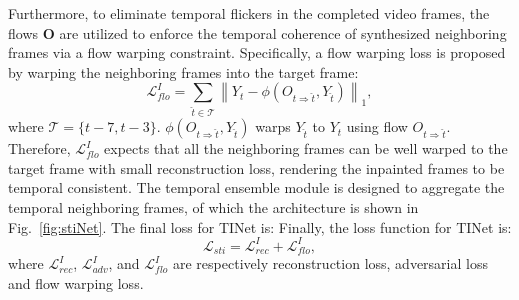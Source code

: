 Furthermore, to eliminate temporal flickers in the completed video frames, the flows $\boldsymbol{O}$ are utilized to enforce the temporal coherence of synthesized neighboring frames via a flow warping constraint. 
%
Specifically, a flow warping loss is proposed by warping the neighboring frames into the target frame: 
\begin{equation}
	\label{eq:inp_flow}
	\mathcal{L}^I_{flo}=\sum_{\widehat{t}\in\mathcal{T}}\left\| Y_t-\phi(O_{t\Rightarrow \widehat{t}},Y_{\widehat{t}}) \right\|_1,
\end{equation}
where $\mathcal{T}=\{t-7,t-3\}$. $\phi(O_{t\Rightarrow \widehat{t}},Y_{\widehat{t}})$ warps $Y_{\widehat{t}}$ to $Y_{t}$ using flow $O_{t\Rightarrow \widehat{t}}$.
Therefore, $\mathcal{L}^I_{flo}$ expects that all the neighboring frames can be well warped to the target frame with small reconstruction loss, rendering the inpainted frames to be temporal consistent.
The temporal ensemble module is designed to aggregate the temporal neighboring frames, of which the architecture is shown in Fig.~\ref{fig:stiNet}.
The final loss for TINet is:
Finally, the loss function for TINet is:
\begin{equation}
	\label{eq:inpain_all}
	\mathcal{L}_{sti}=\mathcal{L}^{I}_{rec}+ \mathcal{L}^I_{flo},
\end{equation}
where $\mathcal{L}^{I}_{rec}$, $\mathcal{L}^I_{adv}$, and $\mathcal{L}^I_{flo}$ are respectively reconstruction loss, adversarial loss and flow warping loss.






